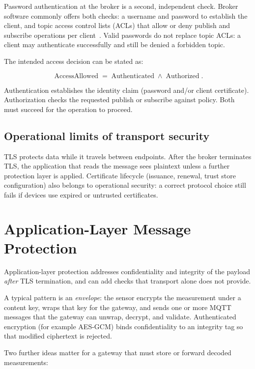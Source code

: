 \documentclass[12pt,a4paper]{report}
\begin{document}
Password authentication at the broker is a second,
independent check. Broker software commonly offers both
checks: a username and password to establish the client,
and topic access control lists (ACLs) that allow or deny
publish and subscribe operations per
client~\cite{mqttsurvey}.
Valid passwords do not replace topic ACLs: a client may
authenticate successfully and still be denied a
forbidden topic.

The intended access decision can be stated as:

\begin{equation}
\operatorname{AccessAllowed}
=
\operatorname{Authenticated}
\land
\operatorname{Authorized}.
\end{equation}

Authentication establishes the identity claim
(password and/or client certificate). Authorization
checks the requested publish or subscribe against
policy. Both must succeed for the operation to proceed.

\subsection{Operational limits of transport security}

TLS protects data while it travels between endpoints.
After the broker terminates TLS, the application that
reads the message sees plaintext unless a further
protection layer is applied. Certificate lifecycle
(issuance, renewal, trust store configuration) also
belongs to operational security: a correct protocol
choice still fails if devices use expired or untrusted
certificates.

\section{Application-Layer Message Protection}

Application-layer protection addresses confidentiality
and integrity of the payload \emph{after} TLS
termination, and can add checks that transport alone
does not provide.

A typical pattern is an \emph{envelope}: the sensor
encrypts the measurement under a content key, wraps
that key for the gateway, and sends one or more MQTT
messages that the gateway can unwrap, decrypt, and
validate. Authenticated encryption (for example
AES-GCM) binds confidentiality to an integrity tag so
that modified ciphertext is rejected.

Two further ideas matter for a gateway that must store
or forward decoded measurements:
\end{document}

